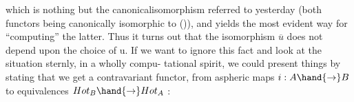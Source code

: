 which is nothing but the canonicalisomorphism referred to yesterday
\margin{(*)} (both functors being canonically isomorphic to ()), and yields the
most evident way for \allowbreak{}``computing'' the latter. Thus it turns out that
the isomorphism $\overline{u}$ does not depend upon the choice of u. If we want
to ignore this fact and look at the situation sternly, in a wholly compu-%
tational spirit, we could present things by stating that we get a
contravariant functor, from aspheric maps $i: A \hand{\to} B$ to equivalences
$Hot_B \hand{\to} Hot_A$ :
